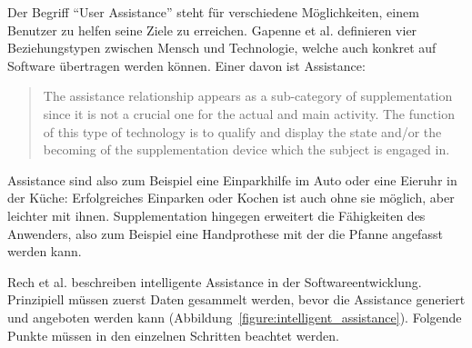 \documentclass[
	headsepline,
	footsepline,
	fontsize=12pt,
	bibliography=totoc
]{scrbook}
\begin{document}

Der Begriff \enquote{User Assistance} steht für verschiedene Möglichkeiten, einem Benutzer zu helfen seine Ziele zu erreichen. Gapenne et al. \cite{Gapenne2002} definieren vier Beziehungstypen zwischen Mensch und Technologie, welche auch konkret auf Software übertragen werden können. Einer davon ist Assistance:

\begin{quote}
The assistance relationship appears as a sub-category of supplementation since it is not a crucial one for the actual and main activity. The function of this type of technology is to qualify and display the state and/or the becoming of the supplementation device which the subject is engaged in.
\end{quote}

Assistance sind also zum Beispiel eine Einparkhilfe im Auto oder eine Eieruhr in der Küche: Erfolgreiches Einparken oder Kochen ist auch ohne sie möglich, aber leichter mit ihnen. Supplementation hingegen erweitert die Fähigkeiten des Anwenders, also zum Beispiel eine Handprothese mit der die Pfanne angefasst werden kann.


Rech et al. \cite{Rech2007} beschreiben intelligente Assistance in der Softwareentwicklung. Prinzipiell müssen zuerst Daten gesammelt werden, bevor die Assistance generiert und angeboten werden kann (Abbildung~\ref{figure:intelligent_assistance}). Folgende Punkte müssen in den einzelnen Schritten beachtet werden.
\end{document}
